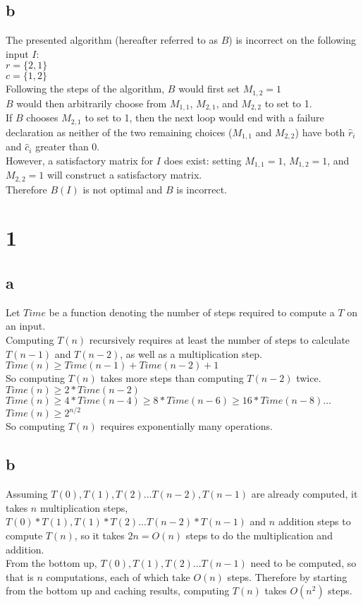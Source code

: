 \documentclass[letterpaper,notitlepage,twoside]{article}
\begin{document}
\subsection*{b}
The presented algorithm (hereafter referred to as $B$) is incorrect on the following input $I$: \\
 $r = \{2, 1\}$\\
 $c = \{1, 2\}$ \\
 Following the steps of the algorithm, $B$ would first set $M_{1,2} = 1$ \\
 $B$ would then arbitrarily choose from $M_{1,1}$, $M_{2,1}$, and $M_{2,2}$ to set to 1. \\
 If $B$ chooses $M_{2,1}$ to set to 1, then the next loop would end with a failure declaration as neither of the two remaining choices ($M_{1,1}$ and $M_{2,2}$) have both $\hat r_i$ and $\hat c_i$ greater than 0. \\
 However, a satisfactory matrix for $I$ does exist: setting $M_{1,1} = 1$, $M_{1,2} = 1$, and $M_{2,2} = 1$ will construct a satisfactory matrix. \\
 Therefore $B(I)$ is not optimal and $B$ is incorrect.


\section*{1}
\subsection*{a}
Let $Time$ be a function denoting the number of steps required to compute a $T$ on an input. \\
Computing $T(n)$ recursively requires at least the number of steps to calculate $T(n - 1)$ and $T(n - 2)$, as well as a multiplication step. \\
$Time(n) \geq Time(n - 1) + Time(n - 2) + 1$ \\
So computing $T(n)$ takes more steps than computing $T(n - 2)$ twice. \\
$Time(n) \geq 2 * Time(n - 2)$ \\
$Time(n) \geq 4 * Time(n - 4) \geq 8 * Time(n - 6) \geq 16 * Time(n - 8) ...$ \\
$Time(n) \geq 2^{n/2}$ \\
So computing $T(n)$ requires exponentially many operations.

\subsection*{b}
Assuming $T(0), T(1), T(2)...T(n -2), T(n - 1)$ are already computed, it takes $n$ multiplication steps, $T(0) * T(1), T(1) * T(2)...T(n - 2) * T(n - 1)$ and $n$ addition steps to compute $T(n)$, so it takes $2n = O(n)$ steps to do the multiplication and addition. \\
From the bottom up, $T(0), T(1), T(2)...T(n - 1)$ need to be computed, so that is $n$ computations, each of which take $O(n)$ steps. Therefore by starting from the bottom up and caching results, computing $T(n)$ takes $O(n^2)$ steps.
\end{document}
